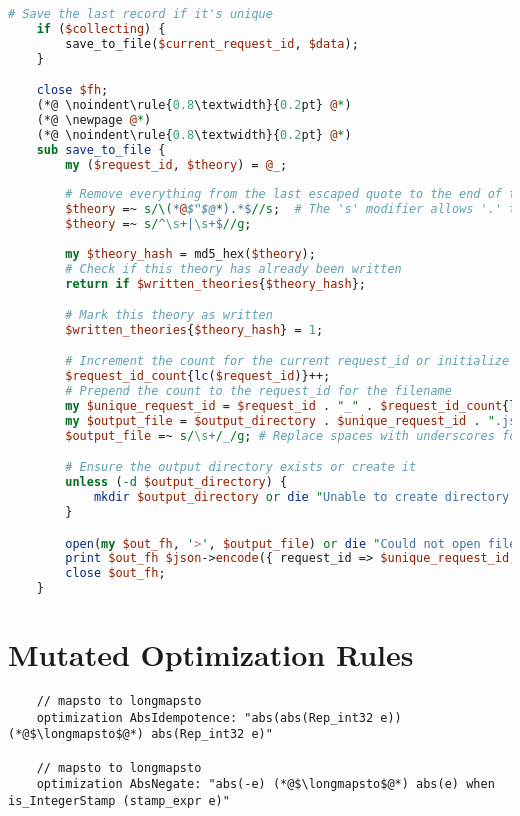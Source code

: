 \begin{appendices}
\begin{lstlisting}[language=perl]
    # Save the last record if it's unique
    if ($collecting) {
        save_to_file($current_request_id, $data);
    }

    close $fh;
    (*@ \noindent\rule{0.8\textwidth}{0.2pt} @*)
    (*@ \newpage @*)
    (*@ \noindent\rule{0.8\textwidth}{0.2pt} @*)
    sub save_to_file {
        my ($request_id, $theory) = @_;
        
        # Remove everything from the last escaped quote to the end of the string
        $theory =~ s/\(*@$"$@*).*$//s;  # The 's' modifier allows '.' to match newline characters
        $theory =~ s/^\s+|\s+$//g;
        
        my $theory_hash = md5_hex($theory);
        # Check if this theory has already been written
        return if $written_theories{$theory_hash};

        # Mark this theory as written
        $written_theories{$theory_hash} = 1;

        # Increment the count for the current request_id or initialize it
        $request_id_count{lc($request_id)}++;
        # Prepend the count to the request_id for the filename
        my $unique_request_id = $request_id . "_" . $request_id_count{lc($request_id)};
        my $output_file = $output_directory . $unique_request_id . ".json";
        $output_file =~ s/\s+/_/g; # Replace spaces with underscores for filenames

        # Ensure the output directory exists or create it
        unless (-d $output_directory) {
            mkdir $output_directory or die "Unable to create directory '$output_directory': $!";
        }

        open(my $out_fh, '>', $output_file) or die "Could not open file '$output_file' $!";
        print $out_fh $json->encode({ request_id => $unique_request_id, theory => $theory });
        close $out_fh;
    }
\end{lstlisting}

\chapter{Mutated Optimization Rules}
\label{app:mutatedOptRules}

\begin{lstlisting}
    // mapsto to longmapsto
    optimization AbsIdempotence: "abs(abs(Rep_int32 e)) (*@$\longmapsto$@*) abs(Rep_int32 e)" 
    
    // mapsto to longmapsto
    optimization AbsNegate: "abs(-e) (*@$\longmapsto$@*) abs(e) when is_IntegerStamp (stamp_expr e)"
    

\end{lstlisting}
\end{appendices}
